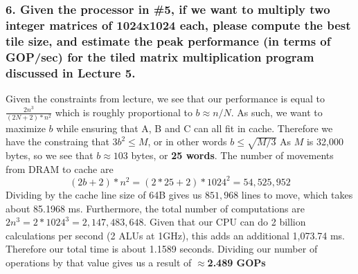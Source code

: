 \documentclass[titlepage]{article}
\begin{document}
\subsubsection*{6. Given the processor in \#5, if we want to multiply two 
integer matrices of 1024x1024 each, please compute the best tile size, and 
estimate the peak performance (in terms of GOP/sec) for the tiled matrix 
multiplication program discussed in Lecture 5.}
Given the constraints from lecture, we see that our performance is equal to
$\frac{2n^3} {(2N + 2) * n^2}$ which is roughly proportional to 
$b \approx n/N$. As such, we want to maximize $b$ while ensuring that A, B and
C can all fit in cache. Therefore we have the constraing that $3b^2 \leq M$, or
in other words $b \leq \sqrt{M/3}$ As $M$ is 32,000 bytes, so we see that 
$b \approx 103$ bytes, or \textbf{25 words}. The number of movements from
DRAM to cache are
\begin{equation}
    (2b + 2) * n^2 = (2*25 + 2)*1024^2 = 54,525,952
\end{equation}
Dividing by the cache line size of 64B gives us $851,968$ lines to move,
which takes about 85.1968 ms. Furthermore, the total number of computations
are $2n^3 = 2*1024^3 = 2,147,483,648$. Given that our CPU can do 2 billion
calculations per second (2 ALUs at 1GHz), this adds an additional 1,073.74 ms.
Therefore our total time is about 1.1589 seconds. Dividing our number of
operations by that value gives us a result of \textbf{$\approx$2.489 GOPs}
\end{document}

